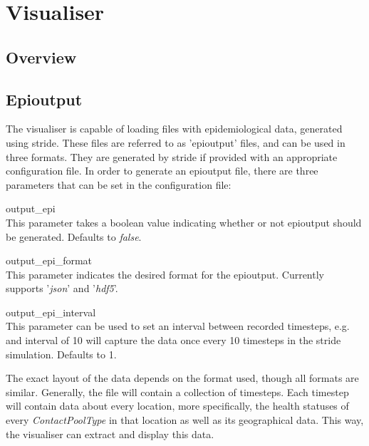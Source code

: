 \chapter{Visualiser}
\label{chap:visualiser}


\section{Overview}
\label{section:overview}


\section{Epioutput}
\label{section:epioutput}
The visualiser is capable of loading files with epidemiological data, generated using stride. These files are referred to as 'epioutput' files, and can be used in three formats. They are generated by stride if provided with an appropriate configuration file. In order to generate an epioutput file, there are three parameters that can be set in the configuration file:

\begin{compactdesc}
\item [output\_epi] \ \\
    This parameter takes a boolean value indicating whether or not epioutput should be generated. Defaults to \emph{false}.
\item [output\_epi\_format] \ \\
    This parameter indicates the desired format for the epioutput. Currently supports '\emph{json}' and '\emph{hdf5}'.
\item [output\_epi\_interval] \ \\
    This parameter can be used to set an interval between recorded timesteps, e.g. and interval of 10 will capture the data once every 10 timesteps in the stride simulation. Defaults to 1.
\end{compactdesc}

The exact layout of the data depends on the format used, though all formats are similar. Generally, the file will contain a collection of timesteps. Each timestep will contain data about every location, more specifically, the health statuses of every \emph{ContactPoolType} in that location as well as its geographical data. This way, the visualiser can extract and display this data.



